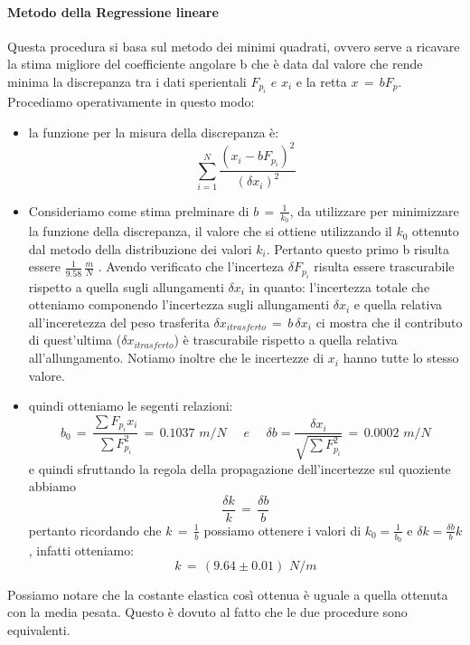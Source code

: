\paragraph{Metodo della Regressione lineare\\}
Questa procedura si basa sul metodo dei minimi quadrati, ovvero serve a ricavare la stima migliore del coefficiente angolare b che è data dal valore che rende minima la discrepanza tra i dati sperientali $F_{p_i} \,\,e\,\, x_i$ e la retta $x \,=\, bF_p$.\\
Procediamo operativamente in questo modo:
\begin{itemize}
	\item{la funzione per la misura della discrepanza è:
			\begin{equation*}
				\sum_{i=1}^{N} \frac{(x_i - bF_{p_i})^2}{(\delta x_i)^2}	
			\end{equation*}}
	\item{Consideriamo come stima prelminare di $b \,=\, \frac{1}{k_0}$, da utilizzare per minimizzare la funzione della discrepanza, il valore che si ottiene utilizzando il $k_0$ ottenuto dal metodo della distribuzione dei valori $k_i$. Pertanto questo primo b risulta essere $\frac{1}{9.58} \, \frac{m}{N}$ . Avendo verificato che l'incerteza $\delta F_{p_i}$ risulta essere trascurabile rispetto a quella sugli allungamenti $\delta x_i$ in quanto: l'incertezza totale che otteniamo componendo l'incertezza sugli allungamenti $\delta x_i$ e quella relativa all'inceretezza del peso trasferita $\delta x_{i trasferto} \,=\, b \, \delta x_i $ ci mostra che il contributo di quest'ultima ($\delta x_{i trasferto}$) è trascurabile rispetto a quella relativa all'allungamento. Notiamo inoltre che le incertezze di $x_i$ hanno tutte lo stesso valore.}
	\item{quindi otteniamo le segenti relazioni:
			\begin{equation*}
				b_0  \,=\,  \frac{\sum F_{p_i}  x_i}{\sum F_{p_i}^2} \,=\, 0.1037 \,\, m/N \quad \,\, e \quad\,\,
				\delta b  =  \frac{\delta x_i}{\sqrt{\sum F_{p_i}^2}} \,=\, 0.0002 \,\, m/N
			\end{equation*}
			e quindi sfruttando la regola della propagazione dell'incertezze sul quoziente abbiamo
			\begin{equation*}
				\frac{\delta k}{k} \,=\, \frac{\delta b}{b}
			\end{equation*}
			pertanto ricordando che $k \,=\, \frac{1}{b}$ possiamo ottenere i valori di $k_0 = \frac{1}{b_0}$ e $\delta k = \frac{\delta b}{b} k$, infatti otteniamo:
			\begin{equation*}
				k \,=\, (9.64 \pm 0.01) \,\,N/m
			\end{equation*}
			}
\end{itemize}
Possiamo notare che la costante elastica così ottenua è uguale a quella ottenuta con la media pesata. Questo è dovuto al fatto che le due procedure sono equivalenti.

